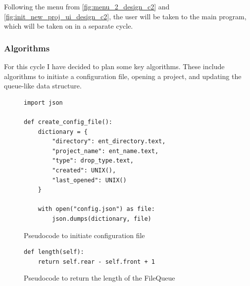 \documentclass[11pt]{article}
\begin{document}
                Following the menu from \autoref{fig:menu_2_design_c2} and \autoref{fig:init_new_proj_ui_design_c2}, the user will be taken to the main program, which will be taken on in a separate cycle.


            \subsubsection{Algorithms}

                For this cycle I have decided to plan some key algorithms. These include algorithms to initiate a configuration file, opening a project, and updating the queue-like data structure.

                \begin{figure}[!h]
                    \begin{verbatim}
import json

def create_config_file():
    dictionary = {
        "directory": ent_directory.text,
        "project_name": ent_name.text,
        "type": drop_type.text,
        "created": UNIX(),
        "last_opened": UNIX()
    }

    with open("config.json") as file:
        json.dumps(dictionary, file)
                    \end{verbatim}
                    \caption{Pseudocode to initiate configuration file}
                    \label{pc:init_config_file_c2}
                \end{figure}




                \newpage

                \begin{figure}[!h]
                    \begin{verbatim}
def length(self):
    return self.rear - self.front + 1
                    \end{verbatim}
                    \caption{Pseudocode to return the length of the FileQueue}
                    \label{pc:fileq-length-method}
                \end{figure}
\end{document}
